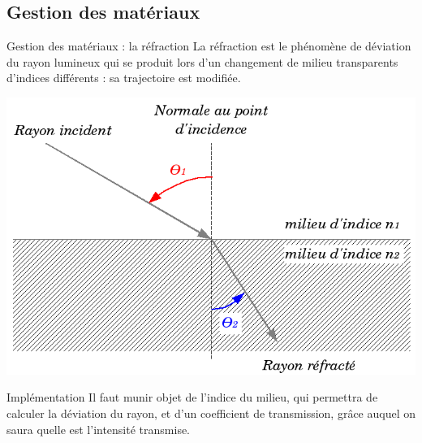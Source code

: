 \documentclass{beamer}
\begin{document}
\subsection{Gestion des matériaux}
\begin{frame}{Gestion des matériaux : la réfraction}
La réfraction est le phénomène de déviation du rayon lumineux qui se produit
lors d'un changement de milieu transparents d'indices différents : sa
trajectoire est modifiée.

\begin{center}
  \includegraphics[scale=0.2]{img/Refraction_fr.png}
\end{center}

\begin{block}{Implémentation}
Il faut munir objet de l'indice du milieu, qui permettra de calculer la
déviation du rayon, et d'un coefficient de transmission, grâce auquel on saura
quelle est l'intensité transmise.
\end{block}
\end{frame}
\end{document}
